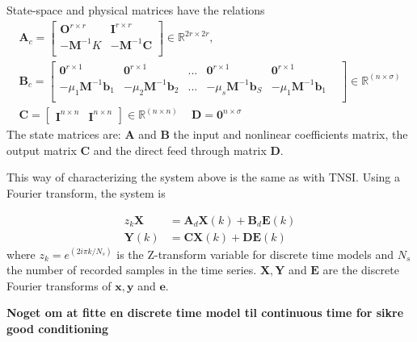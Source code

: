 State-space and physical matrices have the relations
\begin{equation}
  \label{eq:state_to_physical_mat}
  \begin{split}
  \bm A_c =
  \begin{bmatrix}
    \bm O^{r \times r} & \bm I^{r \times r} \\
    -\bm M^{-1}K     & -\bm M^{-1} \bm C \\
  \end{bmatrix}
  \in \mathbb{R}^{2r \times 2r} , \\
  \bm B_c =
  \begin{bmatrix}
    \bm 0^{r \times 1} & \bm 0^{r \times 1} & ... &
    \bm 0^{r \times 1} & \bm 0^{r \times 1} \\
    -\mu_1 \bm M^{-1} \bm b_1 & -\mu_2 \bm M^{-1} \bm b_2 & ... &
    -\mu_s \bm M^{-1} \bm b_S & -\mu_1 \bm M^{-1} \bm b_1 & \\
  \end{bmatrix}
  \in \mathbb{R}^{(n \times \sigma)} \\
  \bm C =
  \begin{bmatrix}
    \bm I^{n\times n} & \bm I^{n\times n}
  \end{bmatrix}
  \in \mathbb{R}^{(n \times n)} \,\quad
  \bm D = \bm 0^{n\times\sigma}
\end{split}
\end{equation}
The state matrices are: $\bm A$ and $\bm B$ the input and nonlinear coefficients
matrix, the output matrix $\bm C$ and the direct feed through matrix $\bm D$.

This way of characterizing the system above is the same as with TNSI. Using a
Fourier transform, the system is

\begin{equation}
  \label{eq:fnsi_freq_state}
  \begin{aligned}
    z_k \bm X &= \bm A_d \bm X(k) + \bm B_d \bm E(k) \\
    \bm Y(k) &= \bm C \bm X(k) + \bm D \bm E(k)
\end{aligned}
\end{equation}
where $z_k = e^{(2i\pi k/N_s)}$ is the Z-transform variable for discrete time
models and $N_s$ the number of recorded samples in the time series. $\bm X, \bm
Y$ and $\bm E$ are the discrete Fourier transforms of $\bm x, \bm y$ and $\bm e$.

\textbf{Noget om at fitte en discrete time model til continuous time for sikre
  good conditioning}

